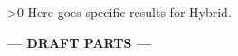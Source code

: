 \ifnum\printdraft>0
	Here goes specific results for Hybrid.
\else
\begin{center}
  	\textbf{--- DRAFT PARTS ---}
\end{center}
\fi